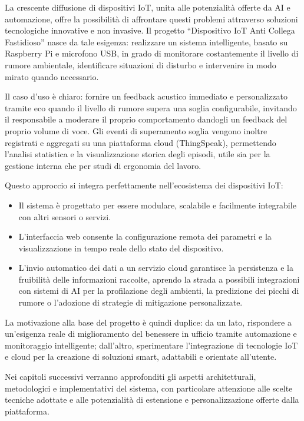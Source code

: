 \documentclass[fleqn,10pt]{SelfArx} %
\begin{document}
La crescente diffusione di dispositivi IoT, unita alle potenzialità offerte da AI e automazione, offre la possibilità di affrontare questi problemi attraverso soluzioni tecnologiche innovative e non invasive. Il progetto “Dispositivo IoT Anti Collega Fastidioso” nasce da tale esigenza: realizzare un sistema intelligente, basato su Raspberry Pi e microfono USB, in grado di monitorare costantemente il livello di rumore ambientale, identificare situazioni di disturbo e intervenire in modo mirato quando necessario. \newline

Il caso d’uso è chiaro: fornire un feedback acustico immediato e personalizzato tramite eco quando il livello di rumore supera una soglia configurabile, invitando il responsabile a moderare il proprio comportamento dandogli un feedback del proprio volume di voce. Gli eventi di superamento soglia vengono inoltre registrati e aggregati su una piattaforma cloud (ThingSpeak), permettendo l’analisi statistica e la visualizzazione storica degli episodi, utile sia per la gestione interna che per studi di ergonomia del lavoro. \newline

Questo approccio si integra perfettamente nell’ecosistema dei dispositivi IoT: 
\begin{itemize}
	\item Il sistema è progettato per essere modulare, scalabile e facilmente integrabile con altri sensori o servizi.
	\item L’interfaccia web consente la configurazione remota dei parametri e la visualizzazione in tempo reale dello stato del dispositivo.
	\item L’invio automatico dei dati a un servizio cloud garantisce la persistenza e la fruibilità delle informazioni raccolte, aprendo la strada a possibili integrazioni con sistemi di AI per la profilazione degli ambienti, la predizione dei picchi di rumore o l’adozione di strategie di mitigazione personalizzate.
\end{itemize} 

La motivazione alla base del progetto è quindi duplice:  
da un lato, rispondere a un’esigenza reale di miglioramento del benessere in ufficio tramite automazione e monitoraggio intelligente; dall’altro, sperimentare l’integrazione di tecnologie IoT e cloud per la creazione di soluzioni smart, adattabili e orientate all’utente. \newline

Nei capitoli successivi verranno approfonditi gli aspetti architetturali, metodologici e implementativi del sistema, con particolare attenzione alle scelte tecniche adottate e alle potenzialità di estensione e personalizzazione offerte dalla piattaforma.
\end{document}
